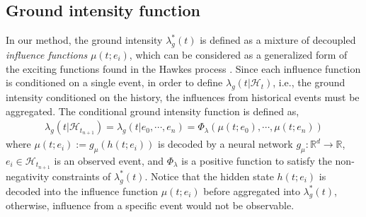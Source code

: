 \subsection{Ground intensity function \label{sec:ground int}}

In our method, the ground intensity $\lambda _g ^*(t)$ is defined as a mixture of decoupled \textit{influence functions} $\mu(t;e_i)$, which can be considered as a generalized form of the exciting functions found in the Hawkes process \cite{bib:hawkes}. 
Since each influence function is conditioned on a single event, in order to define $\lambda _g (t|\mathcal{H}_t)$, i.e., the ground intensity conditioned on the history, the influences from historical events must be aggregated. 
The conditional ground intensity function is defined as,
\begin{align}
    \lambda_g(t|\mathcal{H}_{t_{n+1}}) =\lambda_g(t|e_0, \cdots, e_n) = \Phi_\lambda(\mu(t;e_0), \cdots, \mu(t;e_n))
    \label{eq:lambdag}
\end{align}
where $\mu(t;e_i) := g_\mu(h(t;e_i))$ is decoded by a neural network $g_\mu : \mathbb{R}^d \rightarrow \mathbb{R}$, $ e_i \in \mathcal{H}_{t_{n+1}}$ is an observed event, and $\Phi_\lambda$ is a positive function to satisfy the non-negativity constraints of $\lambda ^* _g (t)$. 
Notice that the hidden state $h(t;e_i)$ is decoded into the influence function $\mu(t;e_i)$ before aggregated into $\lambda ^*_g(t)$, otherwise, influence from a specific event would not be observable. 



